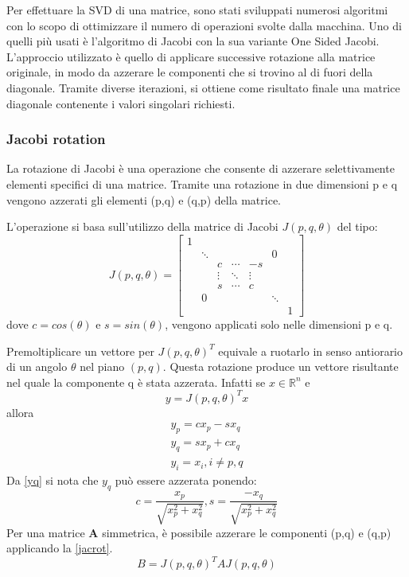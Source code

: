 Per effettuare la SVD di una matrice, sono stati sviluppati numerosi algoritmi con lo scopo di ottimizzare il numero di operazioni svolte dalla macchina.
Uno di quelli più usati è l'algoritmo di Jacobi con la sua variante One Sided Jacobi. L'approccio utilizzato è quello di applicare successive rotazione alla matrice originale, in modo da azzerare le componenti che si trovino al di fuori della diagonale. Tramite diverse iterazioni, si ottiene come risultato finale una matrice diagonale contenente i valori singolari richiesti.
\subsubsection{Jacobi rotation}
La rotazione di Jacobi è una operazione che consente di azzerare selettivamente elementi specifici di una matrice. Tramite una rotazione in due dimensioni p e q vengono azzerati gli elementi (p,q) e (q,p) della matrice.

L'operazione si basa sull'utilizzo della matrice di Jacobi $J(p,q,\theta)$ del tipo:
\[
J(p,q,\theta)=\begin{bmatrix}
1 &  &  &  &  &  & \\
 & \ddots &  &  &  & 0 & \\
 &  & c & \cdots & -s &  & \\
 &  & \vdots & \ddots & \vdots &  & \\
 &  & s & \cdots & c &  & \\
 & 0 &  &  &  & \ddots & \\
 &  &  &  &  &  & 1
\end{bmatrix}
\]
dove $c=cos(\theta)$ e $s=sin(\theta)$, vengono applicati solo nelle dimensioni p e q.

Premoltiplicare un vettore per $J(p,q,\theta)^T$ equivale a ruotarlo in senso antiorario di un angolo $\theta$ nel piano $(p,q)$. Questa rotazione produce un vettore risultante nel quale la componente q è stata azzerata. Infatti se $x\in\mathbb{R}^{n}$ e
\begin{equation}
y=J(p,q,\theta)^Tx
\end{equation}
allora
\begin{eqnarray}
y_p=cx_p-sx_q\\
y_q=sx_p+cx_q\label{yq}\\
y_i=x_i, i\neq p,q
\end{eqnarray}
Da \ref{yq} si nota che $y_q$ può essere azzerata ponendo:
\begin{equation}
c=\frac{x_p}{\sqrt{x_p^2+x_q^2}},s=\frac{-x_q}{\sqrt{x_p^2+x_q^2}}
\end{equation}
Per una matrice $\mathbf{A}$ simmetrica, è possibile azzerare le componenti (p,q) e (q,p) applicando la \ref{jacrot}.
\begin{equation}
B=J(p,q,\theta)^TAJ(p,q,\theta)\label{jacrot}
\end{equation}













